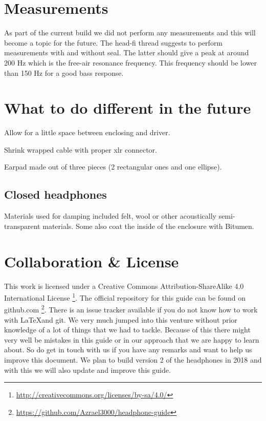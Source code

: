 \documentclass{article}
\begin{document}
\section{Measurements}
\label{s:measurements}

As part of the current build we did not perform any measurements and this will become a topic for the future. The head-fi thread suggests to perform measurements with and without seal. The latter should give a peak at around 200 Hz which is the free-air resonance frequency. This frequency should be lower than 150 Hz for a good bass response.

\section{What to do different in the future}
\label{s:future}

Allow for a little space between enclosing and driver.

Shrink wrapped cable with proper xlr connector.

Earpad made out of three pieces (2 rectangular ones and one ellipse).

\subsection{Closed headphones}
\label{s:future:closed}

Materials used for damping included felt, wool or other acoustically semi-transparent materials. Some also coat the inside of the enclosure with Bitumen.

\section{Collaboration \& License}
This work is licensed under a Creative Commons Attribution-ShareAlike 4.0 International License \footnote{\url{http://creativecommons.org/licenses/by-sa/4.0/}}. The official repository for this guide can be found on github.com \footnote{\url{https://github.com/Azrael3000/headphone-guide}}. There is an issue tracker available if you do not know how to work with \LaTeX and git. We very much jumped into this venture without prior knowledge of a lot of things that we had to tackle. Because of this there might very well be mistakes in this guide or in our approach that we are happy to learn about. So do get in touch with us if you have any remarks and want to help us improve this document. We plan to build version 2 of the headphones in 2018 and with this we will also update and improve this guide.
\end{document}
